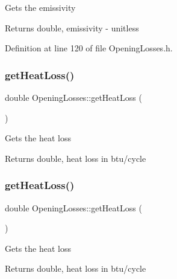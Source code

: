 Gets the emissivity \begin{DoxyReturn}{Returns}
double, emissivity -\/ unitless 
\end{DoxyReturn}


Definition at line 120 of file Opening\+Losses.\+h.

\mbox{\label{class_opening_losses_a38112eb408f72e252b42a68a41a25d0f}} 
\subsubsection{\texorpdfstring{get\+Heat\+Loss()}{getHeatLoss()}\hspace{0.1cm}{\footnotesize\ttfamily [1/3]}}
{\footnotesize\ttfamily double Opening\+Losses\+::get\+Heat\+Loss (\begin{DoxyParamCaption}{ }\end{DoxyParamCaption})}

Gets the heat loss \begin{DoxyReturn}{Returns}
double, heat loss in btu/cycle 
\end{DoxyReturn}
\mbox{\label{class_opening_losses_a38112eb408f72e252b42a68a41a25d0f}} 
\subsubsection{\texorpdfstring{get\+Heat\+Loss()}{getHeatLoss()}\hspace{0.1cm}{\footnotesize\ttfamily [2/3]}}
{\footnotesize\ttfamily double Opening\+Losses\+::get\+Heat\+Loss (\begin{DoxyParamCaption}{ }\end{DoxyParamCaption})}

Gets the heat loss \begin{DoxyReturn}{Returns}
double, heat loss in btu/cycle 
\end{DoxyReturn}
\mbox{\label{class_opening_losses_a38112eb408f72e252b42a68a41a25d0f}} 
